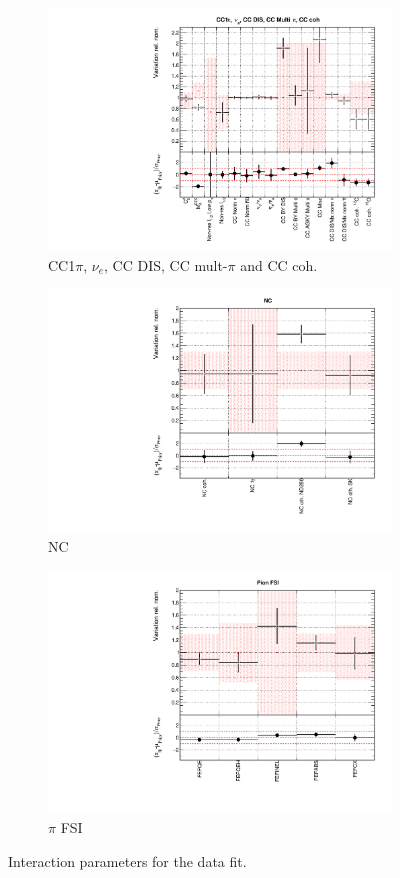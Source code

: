 \begin{figure}
\begin{subfigure}{0.49\textwidth}
  \centering
  \includegraphics[width=0.9\linewidth]{figs/datxsec3}
  \caption{CC1$\pi$, $\nu_e$, CC DIS, CC mult-$\pi$ and CC coh.}
\end{subfigure}
\begin{subfigure}{0.45\textwidth}
  \centering
  \includegraphics[width=0.9\linewidth]{figs/datxsec4}
  \caption{NC}
\end{subfigure}
\begin{subfigure}{0.49\textwidth}
  \centering
  \includegraphics[width=0.9\linewidth]{figs/datxsec5}
  \caption{$\pi$ FSI}
\end{subfigure}
\caption{Interaction parameters for the data fit.}
\label{fig:datxsec}
\end{figure}

